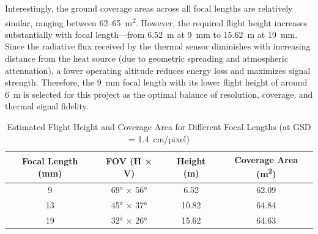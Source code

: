 Interestingly, the ground coverage areas across all focal lengths are relatively similar, ranging between 62–65~m\textsuperscript{2}. However, the required flight height increases substantially with focal length—from 6.52~m at 9~mm to 15.62~m at 19~mm. Since the radiative flux received by the thermal sensor diminishes with increasing distance from the heat source (due to geometric spreading and atmospheric attenuation), a lower operating altitude reduces energy loss and maximizes signal strength. Therefore, the 9~mm focal length with its lower flight height of around 6~m is selected for this project as the optimal balance of resolution, coverage, and thermal signal fidelity.

\begin{table}[H]
\centering
\caption{Estimated Flight Height and Coverage Area for Different Focal Lengths (at GSD = 1.4~cm/pixel)}
\label{tab:fov_results}
\begin{tabular}{|c|c|c|c|}
\hline
\textbf{Focal Length (mm)} & \textbf{FOV (H × V)} & \textbf{Height (m)} & \textbf{Coverage Area (m\textsuperscript{2})} \\
\hline
9  & 69° × 56° & 6.52   & 62.09  \\
\hline
13 & 45° × 37° & 10.82  & 64.84  \\
\hline
19 & 32° × 26° & 15.62 & 64.63  \\
\hline
\end{tabular}
\end{table}
